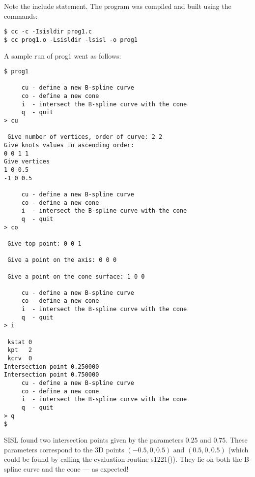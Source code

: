 Note the include statement.
\vfill
\newpage
The program was compiled and built using the commands:
\begin{verbatim}
$ cc -c -Isisldir prog1.c
$ cc prog1.o -Lsisldir -lsisl -o prog1
\end{verbatim}

A sample run of prog1 went as follows:
\begin{verbatim}
$ prog1

     cu - define a new B-spline curve
     co - define a new cone
     i  - intersect the B-spline curve with the cone
     q  - quit
> cu

 Give number of vertices, order of curve: 2 2
Give knots values in ascending order:
0 0 1 1
Give vertices
1 0 0.5
-1 0 0.5

     cu - define a new B-spline curve
     co - define a new cone
     i  - intersect the B-spline curve with the cone
     q  - quit
> co

 Give top point: 0 0 1

 Give a point on the axis: 0 0 0

 Give a point on the cone surface: 1 0 0

     cu - define a new B-spline curve
     co - define a new cone
     i  - intersect the B-spline curve with the cone
     q  - quit
> i

 kstat 0
 kpt   2
 kcrv  0
Intersection point 0.250000
Intersection point 0.750000
     cu - define a new B-spline curve
     co - define a new cone
     i  - intersect the B-spline curve with the cone
     q  - quit
> q
$
\end{verbatim}
SISL found two intersection points given by the parameters
$0.25$ and $0.75$. These parameters correspond to the 3D points
$(-0.5,0,0.5)$ and $(0.5,0,0.5)$ (which could be found by calling
the evaluation routine s1221()). They lie on both
the B-spline curve and the cone --- as expected!




\vfill
\newpage
